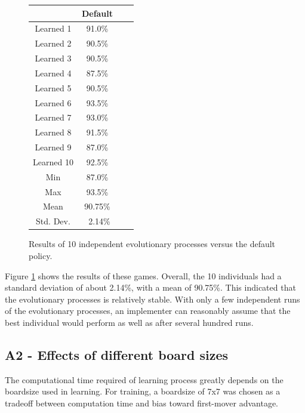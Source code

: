 \documentclass[11pt]{report}
\begin{document}
\begin{figure}
	\begin{center}
		\begin{tabular}{c c c c}
		& Default \\
		\hline
		Learned 1 & 91.0\% \\
		Learned 2 & 90.5\% \\
		Learned 3 & 90.5\% \\
		Learned 4 & 87.5\% \\
		Learned 5 & 90.5\% \\
		Learned 6 & 93.5\% \\
		Learned 7 & 93.0\% \\
		Learned 8 & 91.5\% \\
		Learned 9 & 87.0\% \\
		Learned 10 & 92.5\% \\
		Min & 87.0\% \\
		Max & 93.5\% \\
		Mean & 90.75\% \\
		Std. Dev. & ~2.14\% \\
		\end{tabular}
		\caption{Results of 10 independent evolutionary processes versus the default policy.}
		\label{fig:a1results}
	\end{center}
\end{figure}

Figure \ref{fig:a1results} shows the results of these games. Overall, the 10 individuals had a standard deviation of about 2.14\%, with a mean of 90.75\%. This indicated that the evolutionary processes is relatively stable. With only a few independent runs of the evolutionary processes, an implementer can reasonably assume that the best individual would perform as well as after several hundred runs.

\subsection{A2 - Effects of different board sizes}
The computational time required of learning process greatly depends on the boardsize used in learning. For training, a boardsize of 7x7 was chosen as a tradeoff between computation time and bias toward first-mover advantage.



\end{document}
